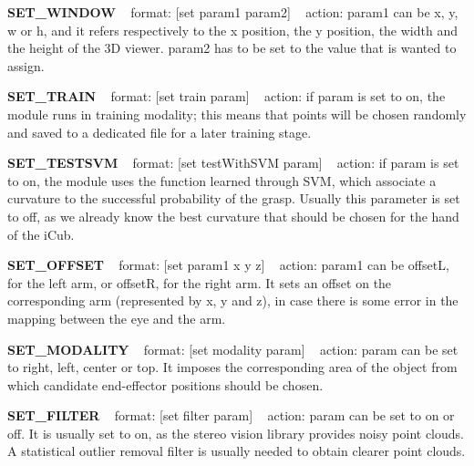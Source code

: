 {\bfseries S\+E\+T\+\_\+\+W\+I\+N\+D\+O\+W} ~\newline
format\+: \mbox{[}set param1 param2\mbox{]} ~\newline
action\+: param1 can be x, y, w or h, and it refers respectively to the x position, the y position, the width and the height of the 3\+D viewer. param2 has to be set to the value that is wanted to assign.

{\bfseries S\+E\+T\+\_\+\+T\+R\+A\+I\+N} ~\newline
format\+: \mbox{[}set train param\mbox{]} ~\newline
action\+: if param is set to on, the module runs in training modality; this means that points will be chosen randomly and saved to a dedicated file for a later training stage.

{\bfseries S\+E\+T\+\_\+\+T\+E\+S\+T\+S\+V\+M} ~\newline
format\+: \mbox{[}set test\+With\+S\+V\+M param\mbox{]} ~\newline
action\+: if param is set to on, the module uses the function learned through S\+V\+M, which associate a curvature to the successful probability of the grasp. Usually this parameter is set to off, as we already know the best curvature that should be chosen for the hand of the i\+Cub.

{\bfseries S\+E\+T\+\_\+\+O\+F\+F\+S\+E\+T} ~\newline
format\+: \mbox{[}set param1 x y z\mbox{]} ~\newline
action\+: param1 can be offset\+L, for the left arm, or offset\+R, for the right arm. It sets an offset on the corresponding arm (represented by x, y and z), in case there is some error in the mapping between the eye and the arm.

{\bfseries S\+E\+T\+\_\+\+M\+O\+D\+A\+L\+I\+T\+Y} ~\newline
format\+: \mbox{[}set modality param\mbox{]} ~\newline
action\+: param can be set to right, left, center or top. It imposes the corresponding area of the object from which candidate end-\/effector positions should be chosen.

{\bfseries S\+E\+T\+\_\+\+F\+I\+L\+T\+E\+R} ~\newline
format\+: \mbox{[}set filter param\mbox{]} ~\newline
action\+: param can be set to on or off. It is usually set to on, as the stereo vision library provides noisy point clouds. A statistical outlier removal filter is usually needed to obtain clearer point clouds.

